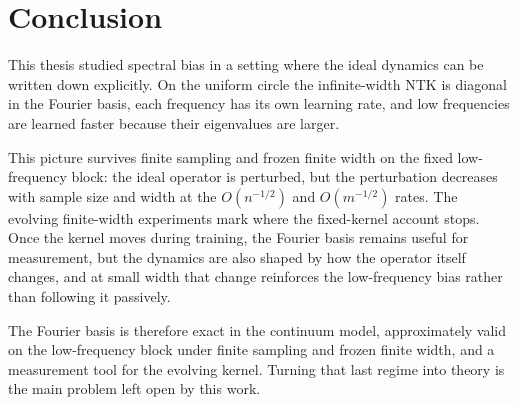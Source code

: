 \section{Conclusion}
\label{sec:discussion-final-conclusion}

This thesis studied spectral bias in a setting where the ideal dynamics can be
written down explicitly. On the uniform circle the infinite-width NTK is diagonal
in the Fourier basis, each frequency has its own learning rate, and low
frequencies are learned faster because their eigenvalues are larger.

This picture survives finite sampling and frozen finite width on the fixed
low-frequency block: the ideal operator is perturbed, but the perturbation
decreases with sample size and width at the \(O(n^{-1/2})\) and \(O(m^{-1/2})\)
rates. The evolving finite-width experiments mark where the fixed-kernel account
stops. Once the kernel moves during training, the Fourier basis remains useful for
measurement, but the dynamics are also shaped by how the operator itself changes,
and at small width that change reinforces the low-frequency bias rather than
following it passively.

The Fourier basis is therefore exact in the continuum model, approximately valid on
the low-frequency block under finite sampling and frozen finite width, and a
measurement tool for the evolving kernel. Turning that last regime into theory is
the main problem left open by this work.
